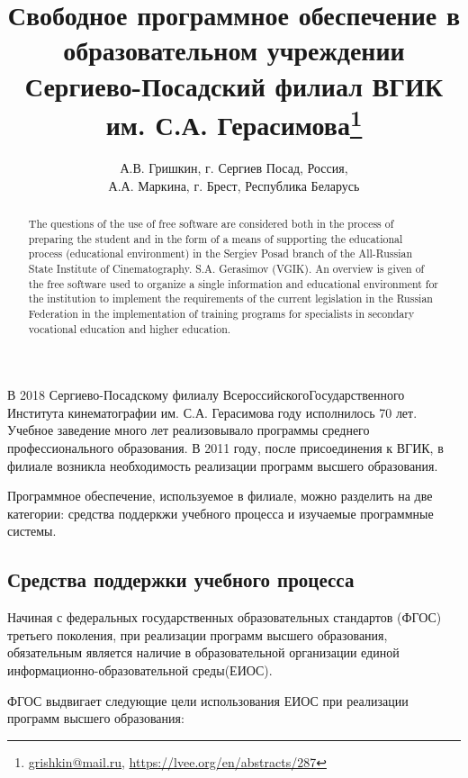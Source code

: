 \documentclass[10pt, a5paper]{article}
\begin{document}
\title{Свободное программное обеспечение в образовательном учреждении Сергиево-Посадский филиал ВГИК им. С.А. Герасимова\footnote{\url{grishkin@mail.ru}, \url{https://lvee.org/en/abstracts/287}}}
\author{А.В. Гришкин, г. Сергиев Посад,  Россия, \\ А.А. Маркина, г. Брест, Республика Беларусь}
\maketitle
\begin{abstract}
The questions of the use of free software are considered both in the process of preparing the student and in the form of a means of supporting the educational process (educational environment) in the Sergiev Posad branch of the All-Russian State Institute of Cinematography. S.A. Gerasimov (VGIK). An overview is given of the free software used to organize a single information and educational environment for the institution to implement the requirements of the current legislation in the Russian Federation in the implementation of training programs for specialists in secondary vocational education and higher education.
\end{abstract}
В 2018 Сергиево-Посадскому филиалу Всероссийского\linebreak Государственного Института кинематографии им. С.А. Герасимова году исполнилось 70 лет. Учебное заведение много лет реализовывало программы среднего профессионального образования. В 2011 году, после присоединения к ВГИК, в филиале возникла необходимость реализации программ высшего образования.

Программное обеспечение, используемое в филиале, можно разделить на две категории: средства поддеркжи учебного процесса и изучаемые программные системы.

\subsection*{Средства поддержки учебного процесса}

Начиная с федеральных государственных образовательных стандартов (ФГОС) третьего поколения, при реализации программ высшего образования, обязательным является наличие в образовательной организации единой информационно-образовательной среды\linebreak (ЕИОС).

ФГОС выдвигает следующие цели использования ЕИОС при реализации программ высшего образования:
\end{document}
